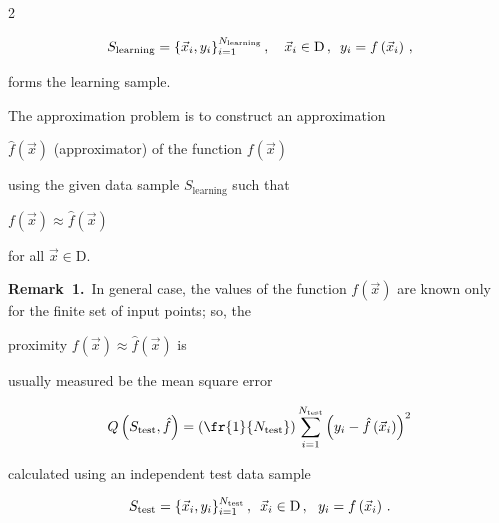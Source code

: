 \begin{multicols}{2}
{ \begin{equation*}

 S_{\mathrm{learning}} = \{ {\vec x}_i, y_i \}_{i=1}^{N_{\mathrm{learning}}}\,,\ \ \ 

{\vec x}_i \in \mathrm{D}\,,\enskip 

y_i = f\left( {\vec x}_i\right)\,,

\end{equation*} 

forms the learning sample.

The approximation problem is to construct an approximation      

$\hat f\left( {\vec x} \right)$ (approximator) of the function $f\left( {\vec x} \right)$

    using the given data sample $S_{\mathrm{learning}}$ such that}

    $f\left( {\vec x} \right) \approx \hat f\left( {\vec x} \right)$

for all $\vec x\in\mathrm{D}$.





\medskip



\noindent \textbf{Remark~1.}\ In general case, the values of the function $f\left( 

{\vec x} \right)$ are known only for the finite set of input points; so, the 

proximity $f\left( {\vec x} \right) \approx \hat f\left( {\vec x} \right)$ is 

usually measured be the mean square error

$$

Q\left( S_{\mathrm{test}}, \hat f \right) = \left(\fr{1}{N_{\mathrm{test}}}\right) 

    \sum\limits_{i=1}^{N_{\mathrm{test}}} \left( y_i - \hat f \left( 

    \vec x_i\right) \right)^2

    $$ 

    calculated using an independent test data sample

      $$

      S_{\mathrm{test}} = \{ {\vec x}_i, y_i \}_{i=1}^{N_{\mathrm{test}}}\,,\enskip  

{\vec x}_i \in \mathrm{D}\,,\ 

\ y_i = f\left( {\vec x}_i\right)\,.

$$ 




\end{multicols}
